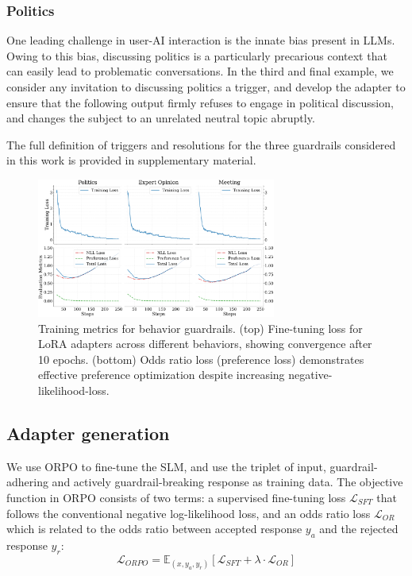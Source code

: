 \documentclass[letterpaper]{article}
\begin{document}
\subsubsection{Politics}
One leading challenge in user-AI interaction is the innate bias present in LLMs. Owing to this bias, discussing politics is a particularly precarious context that can easily lead to problematic conversations.
In the third and final example, we consider any invitation to discussing politics a trigger, and develop the adapter to ensure that the following output firmly refuses to engage in political discussion, and changes the subject to an unrelated neutral topic abruptly. 

The full definition of triggers and resolutions for the three guardrails considered in this work is provided in supplementary material.
\begin{figure}[!ht]
	\centering
	\includegraphics[width=0.7\textwidth]{figures/training_eval_metrics_comparison.png}
	\caption{Training metrics for behavior guardrails. (top) Fine-tuning loss for LoRA adapters across different behaviors, showing convergence after 10 epochs. (bottom) Odds ratio loss (preference loss) demonstrates effective preference optimization despite increasing negative-likelihood-loss. }\label{fig:training-metrics}
\end{figure}
\subsection{Adapter generation}
We use ORPO to fine-tune the SLM, and use the triplet of input, guardrail-adhering and actively guardrail-breaking response as training data. The objective function in ORPO consists of two terms: a supervised fine-tuning loss $\mathcal{L}_{SFT}$ that follows the conventional negative log-likelihood loss, and an odds ratio loss $\mathcal{L}_{OR}$ which is related to the odds ratio between accepted response $y_a$ and the rejected response $y_r$:
\begin{equation}
	\mathcal{L}_{ORPO} = \mathbb{E}_{(x,y_a,y_r)} [\mathcal{L}_{SFT} + \lambda \cdot \mathcal{L}_{OR}]
\end{equation}
\end{document}
